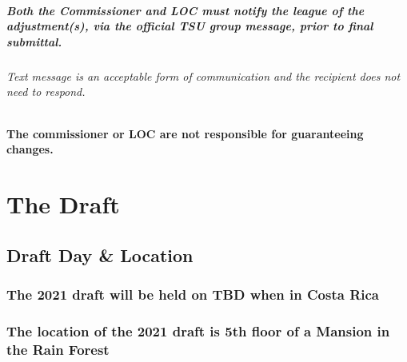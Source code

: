 \documentclass[
]{book}
\begin{document}
\hypertarget{both-the-commissioner-and-loc-must-notify-the-league-of-the-adjustments-via-the-official-tsu-group-message-prior-to-final-submittal.}{%
\paragraph{Both the Commissioner and LOC must notify the league of the adjustment(s), via the official TSU group message, prior to final submittal.}\label{both-the-commissioner-and-loc-must-notify-the-league-of-the-adjustments-via-the-official-tsu-group-message-prior-to-final-submittal.}}

\hypertarget{text-message-is-an-acceptable-form-of-communication-and-the-recipient-does-not-need-to-respond.}{%
\subparagraph{Text message is an acceptable form of communication and the recipient does not need to respond.}\label{text-message-is-an-acceptable-form-of-communication-and-the-recipient-does-not-need-to-respond.}}

\hypertarget{the-commissioner-or-loc-are-not-responsible-for-guaranteeing-changes.}{%
\subsubsection{The commissioner or LOC are not responsible for guaranteeing changes.}\label{the-commissioner-or-loc-are-not-responsible-for-guaranteeing-changes.}}

\hypertarget{the-draft}{%
\chapter{The Draft}\label{the-draft}}

\hypertarget{draft-day-location}{%
\section{Draft Day \& Location}\label{draft-day-location}}

\hypertarget{the-2021-draft-will-be-held-on-tbd-when-in-costa-rica}{%
\subsection{The 2021 draft will be held on TBD when in Costa Rica}\label{the-2021-draft-will-be-held-on-tbd-when-in-costa-rica}}

\hypertarget{the-location-of-the-2021-draft-is-5th-floor-of-a-mansion-in-the-rain-forest}{%
\subsection{The location of the 2021 draft is 5th floor of a Mansion in the Rain Forest}\label{the-location-of-the-2021-draft-is-5th-floor-of-a-mansion-in-the-rain-forest}}
\end{document}

